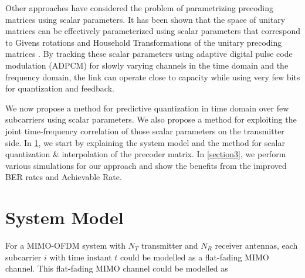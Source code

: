 \documentclass[conference]{IEEEtran}
\begin{document}
  

Other approaches have considered the problem of parametrizing precoding matrices using scalar parameters. It has been shown that the space of unitary matrices can be effectively parameterized using scalar parameters that correspond to Givens rotations and Household Transformations of the unitary precoding matrices \cite{4114278,4556174}. By tracking these scalar parameters using adaptive digital pulse code modulation (ADPCM) for slowly varying channels in the time domain and the frequency domain, the link can operate close to capacity while using very few bits for quantization and feedback. 


We now propose a method for predictive quantization in time domain over few subcarriers using scalar parameters. We also propose a method for exploiting the joint time-frequency correlation of those scalar parameters on the transmitter side. In \ref{section2}, we start by explaining the system model and the method for scalar quantization \& interpolation of the precoder matrix. In \ref{section3}, we perform various simulations for our approach and show the benefits from the improved BER rates and Achievable Rate. 



  

\section{System Model} 

\label{section2} 

For a MIMO-OFDM system with $N_T$ transmitter and $N_R$ receiver antennas, each subcarrier $i$ with time instant $t$ could be modelled as a flat-fading MIMO channel. This flat-fading MIMO channel could be modelled as 
\end{document}
